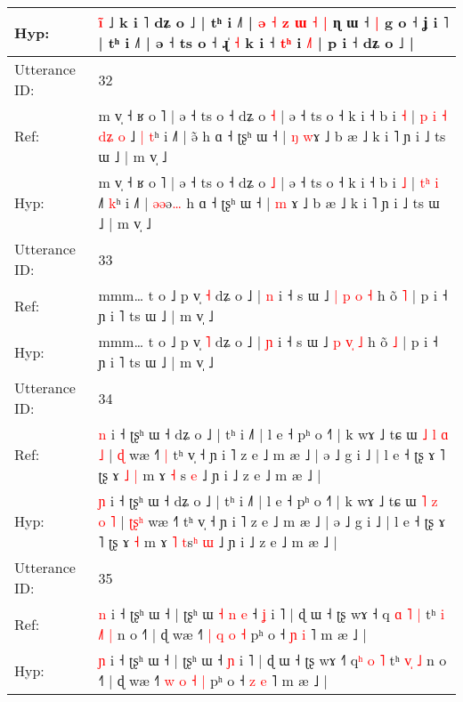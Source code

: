 \documentclass[10pt]{article}
\DeclareRobustCommand{\hl}[1]{{\textcolor{red}{#1}}}
\begin{document}
\begin{longtable}{ll}
 \\
Hyp: & \hl{}\hl{i}\hl{̃} ˩ k i ˥ dʑ o ˩ | tʰ i ˩˥ | \hl{ə} \hl{˧} \hl{z} \hl{ɯ} \hl{˧} \hl{|} ɳ ɯ ˧\hl{ }\hl{|} g o ˧ ʝ i\hl{}\hl{}\hl{}\hl{}\hl{}\hl{}\hl{}\hl{} \hl{}˥ | tʰ i ˩˥ | ə ˧ ts o ˧ ɻ\hl{}\hl{}\hl{}\hl{̍} \hl{˧} k i ˧ \hl{t}\hl{ʰ} i \hl{˩}\hl{˥} | p i ˧ dʑ o ˩ |
 \\
\midrule
Utterance ID: & 32 \\
Ref: & m v̩ ˧ ʁ o ˥ | ə ˧ ts o ˧ dʑ o \hl{˧} | ə ˧ ts o ˧ k i ˧ b i \hl{˧} |\hl{ }\hl{p}\hl{ }\hl{i}\hl{ }\hl{˧} \hl{d}\hl{ʑ} \hl{o} ˩\hl{ }\hl{|} \hl{t}ʰ i ˩˥ | \hl{}\hl{}ə\hl{̃} h ɑ ˧ ʈʂʰ ɯ ˧ | \hl{ŋ} \hl{w}ɤ ˩ b æ ˩ k i ˥ ɲ i ˩ ts ɯ ˩ | m v̩ ˩
 \\
Hyp: & m v̩ ˧ ʁ o ˥ | ə ˧ ts o ˧ dʑ o \hl{˩} | ə ˧ ts o ˧ k i ˧ b i \hl{˩} |\hl{}\hl{}\hl{}\hl{}\hl{}\hl{} \hl{t}\hl{ʰ} \hl{i} ˩\hl{}\hl{˥} \hl{k}ʰ i ˩˥ | \hl{ə}\hl{ə}ə\hl{…} h ɑ ˧ ʈʂʰ ɯ ˧ | \hl{m} \hl{}ɤ ˩ b æ ˩ k i ˥ ɲ i ˩ ts ɯ ˩ | m v̩ ˩
 \\
\midrule
Utterance ID: & 33 \\
Ref: & mmm… t o ˩ p v̩ \hl{˧} dʑ o ˩ | \hl{n} i ˧ s ɯ ˩ \hl{|} \hl{p}\hl{ }\hl{o} \hl{˧} h õ \hl{˥} | p i ˧ ɲ i ˥ ts ɯ ˩ | m v̩ ˩
 \\
Hyp: & mmm… t o ˩ p v̩ \hl{˥} dʑ o ˩ | \hl{ɲ} i ˧ s ɯ ˩ \hl{p} \hl{}\hl{v}\hl{̩} \hl{˩} h õ \hl{˩} | p i ˧ ɲ i ˥ ts ɯ ˩ | m v̩ ˩
 \\
\midrule
Utterance ID: & 34 \\
Ref: & \hl{n} i ˧ ʈʂʰ ɯ ˧ dʑ o ˩ | tʰ i ˩˥ | l e ˧ pʰ o ˧˥ | k wɤ ˩ tɕ ɯ \hl{˩} \hl{l} \hl{ɑ} \hl{˩} | \hl{}\hl{}\hl{ɖ} wæ ˧˥\hl{ }\hl{|} tʰ v̩ ˧ ɲ i ˥ z e ˩ m æ ˩ | ə ˩ g i ˩ | l e ˧ ʈʂ ɤ ˥ ʈʂ ɤ\hl{ }\hl{˩} \hl{|} m ɤ \hl{˧} \hl{}s\hl{} \hl{e} ˩ ɲ i ˩ z e ˩ m æ ˩ |
 \\
Hyp: & \hl{ɲ} i ˧ ʈʂʰ ɯ ˧ dʑ o ˩ | tʰ i ˩˥ | l e ˧ pʰ o ˧˥ | k wɤ ˩ tɕ ɯ \hl{˥} \hl{z} \hl{o} \hl{˥} | \hl{ʈ}\hl{ʂ}\hl{ʰ} wæ ˧˥\hl{}\hl{} tʰ v̩ ˧ ɲ i ˥ z e ˩ m æ ˩ | ə ˩ g i ˩ | l e ˧ ʈʂ ɤ ˥ ʈʂ ɤ\hl{}\hl{} \hl{˧} m ɤ \hl{˥} \hl{t}s\hl{ʰ} \hl{ɯ} ˩ ɲ i ˩ z e ˩ m æ ˩ |
 \\
\midrule
Utterance ID: & 35 \\
Ref: & \hl{n} i ˧ ʈʂʰ ɯ ˧ | ʈʂʰ ɯ\hl{ }\hl{˧}\hl{ }\hl{n}\hl{ }\hl{e} ˧ \hl{ʝ} i ˥ | ɖ ɯ ˧ ʈʂ wɤ ˧\hl{} q\hl{ }\hl{ɑ} \hl{˥} \hl{|} tʰ\hl{ }\hl{i} \hl{˩}\hl{˥} \hl{|} n o ˧˥ | ɖ wæ ˧˥ \hl{|} \hl{q} \hl{o} \hl{˧} pʰ o ˧ \hl{ɲ} \hl{i} ˥ m æ ˩ |
 \\
Hyp: & \hl{ɲ} i ˧ ʈʂʰ ɯ ˧ | ʈʂʰ ɯ\hl{}\hl{}\hl{}\hl{}\hl{}\hl{} ˧ \hl{ɲ} i ˥ | ɖ ɯ ˧ ʈʂ wɤ ˧\hl{˥} q\hl{}\hl{ʰ} \hl{o} \hl{˥} tʰ\hl{}\hl{} \hl{v}\hl{̩} \hl{˩} n o ˧˥ | ɖ wæ ˧˥ \hl{w} \hl{o} \hl{˧} \hl{|} pʰ o ˧ \hl{z} \hl{e} ˥ m æ ˩ |

\end{longtable}
\end{document}
